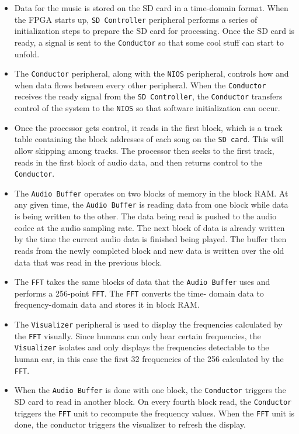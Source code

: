 \documentclass{article}
\begin{document}
\begin{itemize}
	\item Data for the music is stored on the SD card in a time-domain format.
		When the FPGA starts up, \texttt{SD Controller} peripheral performs a 
		series of
		initialization steps to prepare the SD card for processing. Once the 
		SD card is ready, a signal is sent to the \texttt{Conductor} so that some cool 
		stuff can start to unfold.  
	\item The \texttt{Conductor} peripheral, along with the \texttt{NIOS} peripheral,
		controls how and when data flows between every other peripheral. 
		When the \texttt{Conductor} receives the ready signal from the 
		\texttt{SD Controller}, 
		the \texttt{Conductor} transfers control of the system to the \texttt{NIOS} so 
		that 
		software initialization can occur.  
	\item Once the processor gets control, it reads in the first block, which
		is a track table containing the block addresses of each song on the 
		\texttt{SD
		card}. This will allow skipping among tracks. The processor then
		seeks to the first track, reads in the first block of audio data, and
		then returns control to the \texttt{Conductor}.
	\item The \texttt{Audio Buffer} operates on two blocks of memory in the 
		block RAM.
		At any given time, the \texttt{Audio Buffer} is reading data from one block
		while data is being written to the other. The data being read is
		pushed to the audio codec at the audio sampling rate. 
		The next block of data is already written by the time the current audio 
		data is finished being played. The buffer then reads from the newly 
		completed block and new data is written over the old data that was 
		read in the previous block.
	\item The \texttt{FFT} takes the same blocks of data that the \texttt{Audio Buffer} 
		uses
		and performs a 256-point \texttt{FFT}. The \texttt{FFT} converts the time-
		domain data
		to frequency-domain data and stores it in block RAM.  
	\item The \texttt{Visualizer} peripheral is used to display the frequencies
		calculated by the \texttt{FFT} visually. Since humans can only hear
		certain frequencies, the \texttt{Visualizer} isolates and only displays
		the frequencies detectable to the human ear, in this case the
		first 32 frequencies of the 256 calculated by the \texttt{FFT}.  
	\item When the \texttt{Audio Buffer} is done with one block, the 
		\texttt{Conductor} triggers
		the SD card to read in another block. On every fourth block read, the
		\texttt{Conductor }triggers the \texttt{FFT} unit to recompute the frequency 
		values.
		When the \texttt{FFT} unit is done, the conductor triggers the visualizer to
		refresh the display.
\end{itemize}
\end{document}
